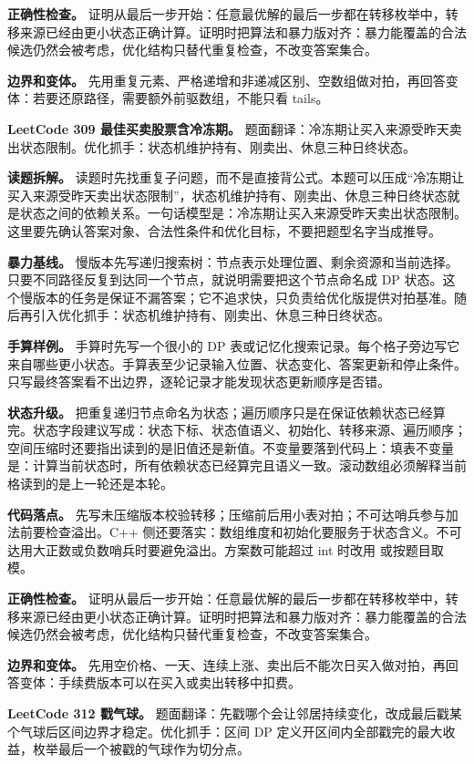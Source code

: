 \textbf{正确性检查。} 证明从最后一步开始：任意最优解的最后一步都在转移枚举中，转移来源已经由更小状态正确计算。证明时把算法和暴力版对齐：暴力能覆盖的合法候选仍然会被考虑，优化结构只替代重复检查，不改变答案集合。

\textbf{边界和变体。} 先用重复元素、严格递增和非递减区别、空数组做对拍，再回答变体：若要还原路径，需要额外前驱数组，不能只看 tails。

\noindent\textbf{LeetCode 309 最佳买卖股票含冷冻期。} 题面翻译：冷冻期让买入来源受昨天卖出状态限制。优化抓手：状态机维护持有、刚卖出、休息三种日终状态。

\textbf{读题拆解。} 读题时先找重复子问题，而不是直接背公式。本题可以压成“冷冻期让买入来源受昨天卖出状态限制”，状态机维护持有、刚卖出、休息三种日终状态就是状态之间的依赖关系。一句话模型是：冷冻期让买入来源受昨天卖出状态限制。这里要先确认答案对象、合法性条件和优化目标，不要把题型名字当成推导。

\textbf{暴力基线。} 慢版本先写递归搜索树：节点表示处理位置、剩余资源和当前选择。只要不同路径反复到达同一个节点，就说明需要把这个节点命名成 DP 状态。这个慢版本的任务是保证不漏答案；它不追求快，只负责给优化版提供对拍基准。随后再引入优化抓手：状态机维护持有、刚卖出、休息三种日终状态。

\textbf{手算样例。} 手算时先写一个很小的 DP 表或记忆化搜索记录。每个格子旁边写它来自哪些更小状态。手算表至少记录输入位置、状态变化、答案更新和停止条件。只写最终答案看不出边界，逐轮记录才能发现状态更新顺序是否错。

\textbf{状态升级。} 把重复递归节点命名为状态；遍历顺序只是在保证依赖状态已经算完。状态字段建议写成：状态下标、状态值语义、初始化、转移来源、遍历顺序；空间压缩时还要指出读到的是旧值还是新值。不变量要落到代码上：填表不变量是：计算当前状态时，所有依赖状态已经算完且语义一致。滚动数组必须解释当前格读到的是上一轮还是本轮。

\textbf{代码落点。} 先写未压缩版本校验转移；压缩前后用小表对拍；不可达哨兵参与加法前要检查溢出。C++ 侧还要落实：数组维度和初始化要服务于状态含义。不可达用大正数或负数哨兵时要避免溢出。方案数可能超过 int 时改用  或按题目取模。

\textbf{正确性检查。} 证明从最后一步开始：任意最优解的最后一步都在转移枚举中，转移来源已经由更小状态正确计算。证明时把算法和暴力版对齐：暴力能覆盖的合法候选仍然会被考虑，优化结构只替代重复检查，不改变答案集合。

\textbf{边界和变体。} 先用空价格、一天、连续上涨、卖出后不能次日买入做对拍，再回答变体：手续费版本可以在买入或卖出转移中扣费。

\noindent\textbf{LeetCode 312 戳气球。} 题面翻译：先戳哪个会让邻居持续变化，改成最后戳某个气球后区间边界才稳定。优化抓手：区间 DP 定义开区间内全部戳完的最大收益，枚举最后一个被戳的气球作为切分点。

